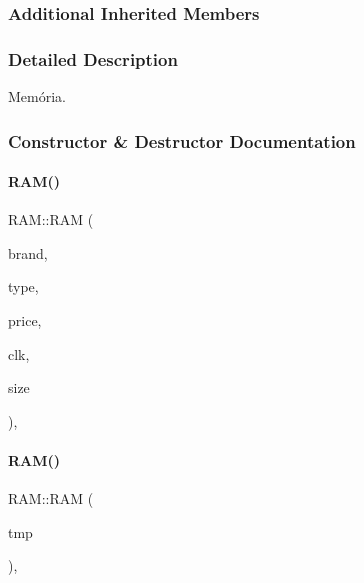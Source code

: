 \subsubsection*{Additional Inherited Members}


\subsubsection{Detailed Description}
Memória. 

\subsubsection{Constructor \& Destructor Documentation}
\mbox{\label{class_r_a_m_a1869d6bd505e7fb58b809270626c82f2}} 
\paragraph{\texorpdfstring{RAM()}{RAM()}\hspace{0.1cm}{\footnotesize\ttfamily [1/2]}}
{\footnotesize\ttfamily R\+A\+M\+::\+R\+AM (\begin{DoxyParamCaption}\item[{\mbox{\hyperlink{class_string}{String}}}]{brand,  }\item[{\mbox{\hyperlink{class_string}{String}}}]{type,  }\item[{int}]{price,  }\item[{int}]{clk,  }\item[{int}]{size }\end{DoxyParamCaption})\hspace{0.3cm}{\ttfamily [inline]}, {\ttfamily [explicit]}}

\mbox{\label{class_r_a_m_afbdf895c5aa8cfce8f24197b89a9d82d}} 
\paragraph{\texorpdfstring{RAM()}{RAM()}\hspace{0.1cm}{\footnotesize\ttfamily [2/2]}}
{\footnotesize\ttfamily R\+A\+M\+::\+R\+AM (\begin{DoxyParamCaption}\item[{\mbox{\hyperlink{struct_temp_input}{Temp\+Input}} \&}]{tmp }\end{DoxyParamCaption})\hspace{0.3cm}{\ttfamily [inline]}, {\ttfamily [explicit]}}



